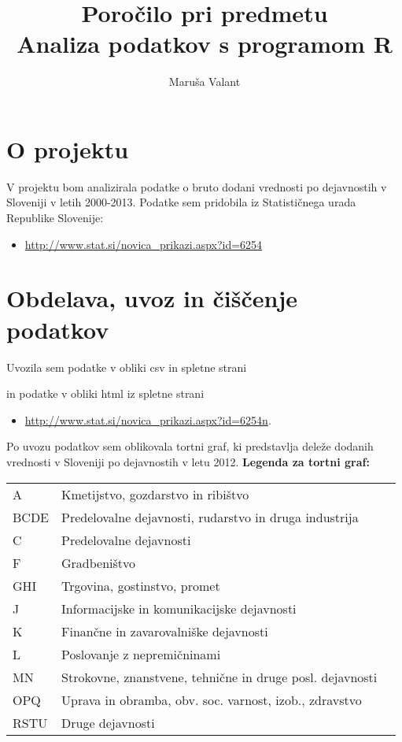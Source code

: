 \documentclass[a4paper, 11pt]{article}
\begin{document}
\title{Poročilo pri predmetu \\
Analiza podatkov s programom R}
\author{Maruša Valant}

\section{O projektu}

V projektu bom analizirala podatke o bruto dodani vrednosti po dejavnostih v Sloveniji v letih 2000-2013. Podatke sem pridobila iz Statističnega urada Republike Slovenije:

\begin{itemize}

\item{\url{http://www.stat.si/novica_prikazi.aspx?id=6254}}

\end{itemize}

\section{Obdelava, uvoz in čiščenje podatkov}

Uvozila sem podatke v obliki csv in spletne strani



in podatke v obliki html iz spletne strani 
\begin{itemize}
\item{\url{http://www.stat.si/novica_prikazi.aspx?id=6254n}}.
\end{itemize}


Po uvozu podatkov sem oblikovala tortni graf, ki predstavlja deleže dodanih vrednosti v Sloveniji po dejavnostih v letu 2012.
\newpage
\textbf{Legenda za tortni graf:}
\begin{table}[h]
\begin{tabular}{lll}
A & Kmetijstvo, gozdarstvo in ribištvo \\
BCDE & Predelovalne dejavnosti, rudarstvo in druga industrija \\
C & Predelovalne dejavnosti \\
F & Gradbeništvo \\
GHI & Trgovina, gostinstvo, promet \\
J & Informacijske in komunikacijske dejavnosti\\
K & Finančne in zavarovalniške dejavnosti\\
L & Poslovanje z nepremičninami \\
MN & Strokovne, znanstvene, tehnične in druge posl. dejavnosti \\
OPQ & Uprava in obramba, obv. soc. varnost, izob., zdravstvo \\
RSTU & Druge dejavnosti
\end{tabular}
\end{table}
\end{document}
